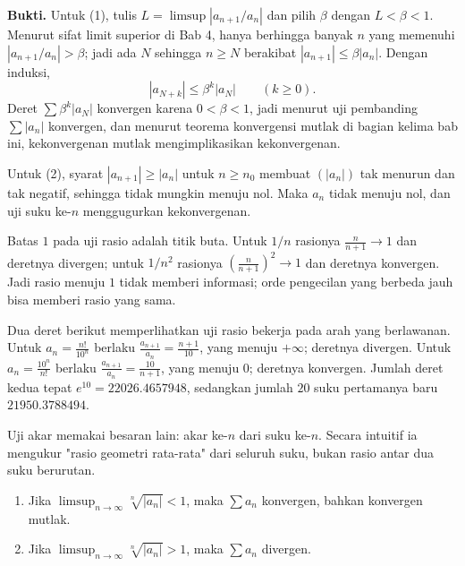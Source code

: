\noindent\textbf{Bukti.} Untuk (1), tulis $L = \limsup |a_{n+1}/a_n|$ dan pilih $\beta$ dengan $L < \beta < 1$.
Menurut sifat limit superior di Bab 4, hanya berhingga banyak $n$ yang memenuhi
$|a_{n+1}/a_n| > \beta$; jadi ada $N$ sehingga $n \ge N$ berakibat
$|a_{n+1}| \le \beta |a_n|$. Dengan induksi,
\[
  |a_{N+k}| \le \beta^{k} |a_N| \qquad (k \ge 0).
\]
Deret $\sum \beta^k |a_N|$ konvergen karena $0<\beta<1$, jadi menurut uji pembanding
$\sum |a_n|$ konvergen, dan menurut teorema konvergensi mutlak di bagian kelima bab ini,
kekonvergenan mutlak mengimplikasikan kekonvergenan.

Untuk (2), syarat $|a_{n+1}| \ge |a_n|$ untuk $n \ge n_0$ membuat $(|a_n|)$ tak
menurun dan tak negatif, sehingga tidak mungkin menuju nol. Maka $a_n$ tidak menuju
nol, dan uji suku ke-$n$ menggugurkan kekonvergenan.


Batas $1$ pada uji rasio adalah titik buta. Untuk $1/n$ rasionya $\frac{n}{n+1} \to 1$
dan deretnya divergen; untuk $1/n^2$ rasionya $\left(\frac{n}{n+1}\right)^2 \to 1$
dan deretnya konvergen. Jadi rasio menuju $1$ tidak memberi informasi; orde pengecilan
yang berbeda jauh bisa memberi rasio yang sama.

Dua deret berikut memperlihatkan uji rasio bekerja pada arah yang berlawanan.
Untuk $a_n = \frac{n!}{10^n}$ berlaku
$\frac{a_{n+1}}{a_n} = \frac{n+1}{10}$, yang menuju $+\infty$; deretnya divergen.
Untuk $a_n = \frac{10^n}{n!}$ berlaku $\frac{a_{n+1}}{a_n} = \frac{10}{n+1}$, yang
menuju $0$; deretnya konvergen. Jumlah deret kedua tepat $e^{10} = 22026.4657948$,
sedangkan jumlah $20$ suku pertamanya baru $21950.3788494$.

Uji akar memakai besaran lain: akar ke-$n$ dari suku ke-$n$. Secara intuitif ia
mengukur "rasio geometri rata-rata" dari seluruh suku, bukan rasio antar dua suku
berurutan.

\begin{teorema}
\begin{enumerate}
\item Jika $\limsup_{n\to\infty} \sqrt[n]{|a_n|} < 1$, maka $\sum a_n$ konvergen,
      bahkan konvergen mutlak.
\item Jika $\limsup_{n\to\infty} \sqrt[n]{|a_n|} > 1$, maka $\sum a_n$ divergen.
\end{enumerate}
\end{teorema}

